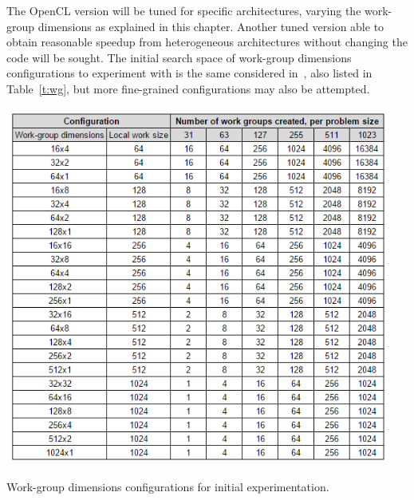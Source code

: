 The OpenCL version will be tuned for specific architectures, varying the work-group dimensions as explained in this chapter. Another tuned version able to obtain reasonable speedup from heterogeneous architectures without changing the code will be sought. The initial search space of work-group dimensions configurations to experiment with is the same considered in~\cite{dolbeau2013one}, also listed in Table~\ref{t:wg}, but more fine-grained configurations may also be attempted.

\begin{table}[!h]
\begin{center}
\centerline{\includegraphics[width=5in]{img/wg}}
\caption{Work-group dimensions configurations for initial experimentation.}
\label{t:wg}
\end{center}
\end{table}

